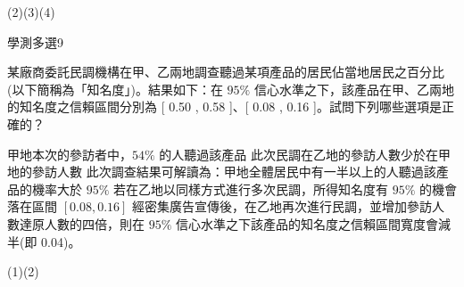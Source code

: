 \begin{QUESTION}
\begin{QBODY}
        \end{QBODY}
        \begin{QFROMS}
        \end{QFROMS}
        \begin{QTAGS}\end{QTAGS}
        \begin{QANS}
            (2)(3)(4)
        \end{QANS}
        \begin{QSOLLIST}
        \end{QSOLLIST}
        \begin{QEMPTYSPACE}
        \end{QEMPTYSPACE}
    \end{QUESTION}
    \begin{QUESTION}
        \begin{ExamInfo}{98}{學測}{多選}{9}
        \end{ExamInfo}
        \begin{ExamAnsRateInfo}{7}{6}{8}{7}
        \end{ExamAnsRateInfo}
        \begin{QBODY}
            某廠商委託民調機構在甲、乙兩地調查聽過某項產品的居民佔當地居民之百分比(以下簡稱為「知名度」)。結果如下：在 $95\%$ 信心水準之下，該產品在甲、乙兩地的知名度之信賴區間分別為 [ 0.50 , 0.58 ]、[ 0.08 , 0.16 ]。試問下列哪些選項是正確的？ 
		\begin{QOPS} 
			\QOP 甲地本次的參訪者中，$54\%$ 的人聽過該產品 
			\QOP 此次民調在乙地的參訪人數少於在甲地的參訪人數 
			\QOP 此次調查結果可解讀為：甲地全體居民中有一半以上的人聽過該產品的機率大於 $95\%$    
			\QOP 若在乙地以同樣方式進行多次民調，所得知名度有 $95\%$ 的機會落在區間 $[0.08 , 0.16 ]$    \QOP 經密集廣告宣傳後，在乙地再次進行民調，並增加參訪人數達原人數的四倍，則在 $95\%$ 
		信心水準之下該產品的知名度之信賴區間寬度會減半(即 0.04)。
		\end{QOPS}
        \end{QBODY}
        \begin{QFROMS}
        \end{QFROMS}
        \begin{QTAGS}\end{QTAGS}
        \begin{QANS}
            (1)(2)
        \end{QANS}
        \begin{QSOLLIST}
        \end{QSOLLIST}
        \begin{QEMPTYSPACE}
        \end{QEMPTYSPACE}
    \end{QUESTION}
